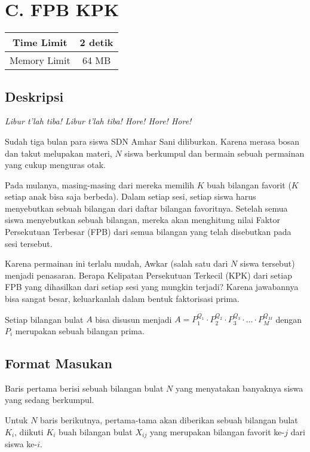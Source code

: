 \documentclass{article}
\begin{document}
\section*{\hfil C. FPB KPK\hfil}

\begin{center}
\begin{tabular}{ |cc| } 
 \hline
 Time Limit & 2 detik \\ 
 \hline
 Memory Limit & 64 MB \\
 \hline
\end{tabular}
\end{center}

\subsection*{Deskripsi}

\par\noindent 
\textit{Libur t'lah tiba! Libur t'lah tiba! Hore! Hore! Hore!}
\newline
\par\noindent Sudah tiga bulan para siswa SDN Amhar Sani diliburkan. Karena merasa bosan dan takut melupakan materi, $N$ siswa berkumpul dan bermain sebuah permainan yang cukup menguras otak.
\newline
\par\noindent 
Pada mulanya, masing-masing dari mereka memilih $K$ buah bilangan favorit ($K$ setiap anak bisa saja berbeda). Dalam setiap sesi, setiap siswa harus menyebutkan sebuah bilangan dari daftar bilangan favoritnya. Setelah semua siswa menyebutkan sebuah bilangan, mereka akan menghitung nilai Faktor Persekutuan Terbesar (FPB) dari semua bilangan yang telah disebutkan pada sesi tersebut.
\newline
\par\noindent 
Karena permainan ini terlalu mudah, Awkar (salah satu dari $N$ siswa tersebut) menjadi penasaran. Berapa Kelipatan Persekutuan Terkecil (KPK) dari setiap FPB yang dihasilkan dari setiap sesi yang mungkin terjadi? Karena jawabannya bisa sangat besar, keluarkanlah dalam bentuk faktorisasi prima.
\newline
\par\noindent 
Setiap bilangan bulat $A$ bisa disusun menjadi $A = P_{1}^{Q_{1}} \cdot P_{2}^{Q_{2}} \cdot P_{3}^{Q_{3}} \cdot ... \cdot P_{M}^{Q_{M}}$ dengan $P_{i}$ merupakan sebuah bilangan prima.

\subsection*{Format Masukan}
\par\noindent 
Baris pertama berisi sebuah bilangan bulat $N$ yang menyatakan banyaknya siswa yang sedang berkumpul.
\newline
\par\noindent 
Untuk $N$ baris berikutnya, pertama-tama akan diberikan sebuah bilangan bulat $K_i$, diikuti $K_i$ buah bilangan bulat $X_{ij}$ yang merupakan bilangan favorit ke-$j$ dari siswa ke-$i$.
\end{document}
